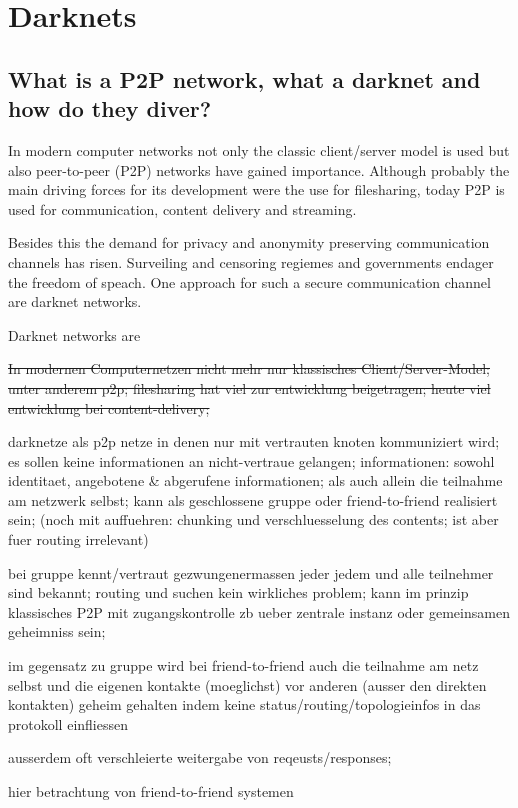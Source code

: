 \chapter{Darknets}

\section{What is a P2P network, what a darknet and how do they diver?}

In modern computer networks not only the classic client/server model is used but also peer-to-peer (P2P) networks have gained importance. Although probably the main driving forces for its development were the use for filesharing, today P2P is used for communication, content delivery and streaming.

Besides this the demand for privacy and anonymity preserving communication channels has risen. Surveiling and censoring regiemes and governments endager the freedom of speach. One approach for such a secure communication channel are darknet networks.

Darknet networks are 

\sout{In modernen Computernetzen nicht mehr nur klassisches Client/Server-Model; unter anderem p2p; filesharing hat viel zur entwicklung beigetragen; heute viel entwicklung bei content-delivery;}

darknetze als p2p netze in denen nur mit vertrauten knoten kommuniziert wird; es sollen keine informationen an nicht-vertraue gelangen; informationen: sowohl identitaet, angebotene & abgerufene informationen; als auch allein die teilnahme am netzwerk selbst; kann als geschlossene gruppe oder friend-to-friend realisiert sein; (noch mit auffuehren: chunking und verschluesselung des contents; ist aber fuer routing irrelevant)

bei gruppe kennt/vertraut gezwungenermassen jeder jedem und alle teilnehmer sind bekannt; routing und suchen kein wirkliches problem; kann im prinzip klassisches P2P mit zugangskontrolle zb ueber zentrale instanz oder gemeinsamen geheimniss sein;

im gegensatz zu gruppe wird bei friend-to-friend auch die teilnahme am netz selbst und die eigenen kontakte (moeglichst) vor anderen (ausser den direkten kontakten) geheim gehalten indem keine status/routing/topologieinfos in das protokoll einfliessen

ausserdem oft verschleierte weitergabe von reqeusts/responses;

hier betrachtung von friend-to-friend systemen

